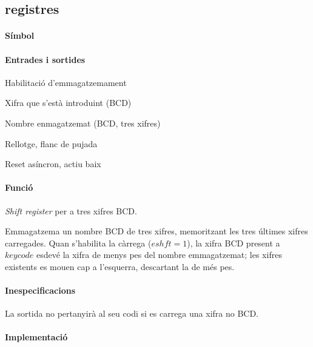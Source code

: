 \subsection{\label{sub:\projectname-registres} \textsf{registres}}

\paragraph{Símbol}

\begin{center}  \end{center}

\paragraph{Entrades i sortides}

\begin{where}
\item[\nodenamebit{eshft}] Habilitació d'emmagatzemament
\item[\nodenamerange{keycode}{3}{0}] Xifra que s'està introduint (BCD)
\item[\nodenamerange{num}{11}{0}] Nombre enmagatzemat (BCD, tres xifres)
\item[\nodenamebit{clk}] Rellotge, flanc de pujada
\item[\nodenamebit{nrst}] Reset asíncron, actiu baix
\end{where}

\paragraph{Funció}

\emph{Shift register} per a tres xifres BCD.

Emmagatzema un nombre BCD de tres xifres, memoritzant les tres últimes
xifres carregades. Quan s'habilita la càrrega ($eshft = 1$), la xifra
BCD present a $keycode$ esdevé la xifra de menys pes del nombre
emmagatzemat; les xifres existents es mouen cap a l'esquerra, descartant
la de més pes.

\paragraph{Inespecificacions}


La sortida no pertanyirà al seu codi si es carrega una xifra no BCD.


\paragraph{Implementació}

